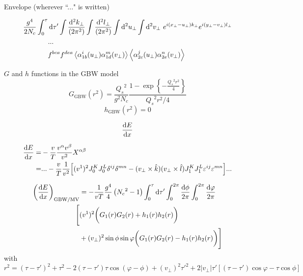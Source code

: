 



Envelope (wherever ``..." is written)

\begin{equation*}
\begin{split}
\frac{g^4}{2 N_c}
\int_0^\tau & \mathop{}\!\mathrm{d} \tau'
\int \frac{\mathop{}\!\mathrm{d}^2 k_\perp}{(2\pi^2)}
\int \frac{\mathop{}\!\mathrm{d}^2 l_\perp}{(2\pi^2)}
\int \mathop{}\!\mathrm{d}^2 u_\perp
\int \mathop{}\!\mathrm{d}^2 v_\perp ~
e^{i (x_\perp - u_\perp) k_\perp}
e^{i (y_\perp - v_\perp) l_\perp} \\
& ... \\
&  f^{bca} f^{dea}
\left< \alpha^i_{1b} (u_\perp) \alpha^m_{1d} (v_\perp) \right>  \left< \alpha^j_{2c} (u_\perp) \alpha^n_{2e} (v_\perp) \right>
\end{split}
\end{equation*}

$G$ and $h$ functions in the GBW model
\begin{equation*}
	G_\text{GBW}(r^2) = \frac{{Q_s}^2}{g^2 N_c} \frac{1-\exp \left\{ -\frac{{Q_s}^2 r^2}{4}\right\}}{{Q_s}^2 r^2/4}
\end{equation*}
\begin{equation*}
	h_\text{GBW}(r^2) = 0
\end{equation*}

\newpage

$$ \frac{\mathop{}\!\mathrm{d} E}{\mathop{}\!\mathrm{d} x}$$

\begin{equation*}
\begin{split}
\frac{\mathop{}\!\mathrm{d} E}{\mathop{}\!\mathrm{d} x} = & -\frac{v}{T} \frac{v^\alpha v^\beta}{v^2} X^{\alpha \beta} \\
 = & ... -\frac{v}{T} \frac{1}{v^2} \Big[ (v^1)^2 J_0^K J_0^L \delta^{ij} \delta^{mn} - (v_\perp \times \hat{k})(v_\perp \times \hat{l}) J_1^K J_1^L  \varepsilon^{ij} \varepsilon^{mn}\Big] ...
\end{split}
\end{equation*}

\begin{equation*}
\begin{split}
\left(\frac{\mathop{}\!\mathrm{d} E}{\mathop{}\!\mathrm{d} x}  \right)_{\text{GBW/MV}} & = - \frac{1}{vT} \frac{g^4}{4}\left({N_c}^2-1 \right)
\int_0^\tau \mathop{}\!\mathrm{d} \tau' \int_0^{2\pi} \frac{\mathop{}\!\mathrm{d} \phi}{2\pi} \int_0^{2\pi} \frac{\mathop{}\!\mathrm{d} \varphi}{2\pi} \\
  \Bigg[ & (v^1)^2 \bigg(G_1(r) G_2(r) + h_1(r)  h_2(r) \bigg) \\
 & + (v_\perp)^2 \sin \phi \sin \varphi \bigg(G_1(r) G_2(r) - h_1(r)   h_2(r) \bigg) \Bigg]
\end{split}
\end{equation*}
with $r^2 = (\tau-\tau')^2 + \tau^2 - 2(\tau-\tau') \tau \cos(\varphi-\phi) +  (v_\perp)^2 \tau'^2 + 2|v_\perp| \tau' \left[(\tau-\tau') \cos \varphi - \tau \cos \phi \right] $

